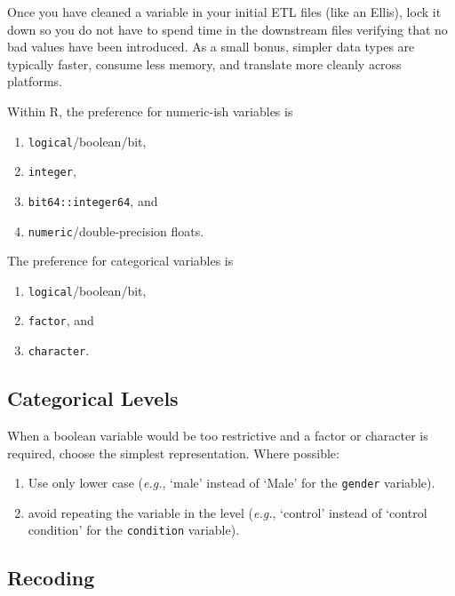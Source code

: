 \documentclass[
]{book}
\providecommand{\tightlist}{%
  \setlength{\itemsep}{0pt}\setlength{\parskip}{0pt}}
\begin{document}
Once you have cleaned a variable in your initial ETL files (like an Ellis), lock it down so you do not have to spend time in the downstream files verifying that no bad values have been introduced. As a small bonus, simpler data types are typically faster, consume less memory, and translate more cleanly across platforms.

Within R, the preference for numeric-ish variables is

\begin{enumerate}
\def\labelenumi{\arabic{enumi}.}
\tightlist
\item
  \texttt{logical}/boolean/bit,
\item
  \texttt{integer},
\item
  \texttt{bit64::integer64}, and
\item
  \texttt{numeric}/double-precision floats.
\end{enumerate}

The preference for categorical variables is

\begin{enumerate}
\def\labelenumi{\arabic{enumi}.}
\tightlist
\item
  \texttt{logical}/boolean/bit,
\item
  \texttt{factor}, and
\item
  \texttt{character}.
\end{enumerate}

\hypertarget{coding-simplify-categorical}{%
\subsection{Categorical Levels}\label{coding-simplify-categorical}}

When a boolean variable would be too restrictive and a factor or character is required, choose the simplest representation. Where possible:

\begin{enumerate}
\def\labelenumi{\arabic{enumi}.}
\tightlist
\item
  Use only lower case (\emph{e.g.}, `male' instead of `Male' for the \texttt{gender} variable).
\item
  avoid repeating the variable in the level (\emph{e.g.}, `control' instead of `control condition' for the \texttt{condition} variable).
\end{enumerate}

\hypertarget{coding-simplify-recoding}{%
\subsection{Recoding}\label{coding-simplify-recoding}}
\end{document}
